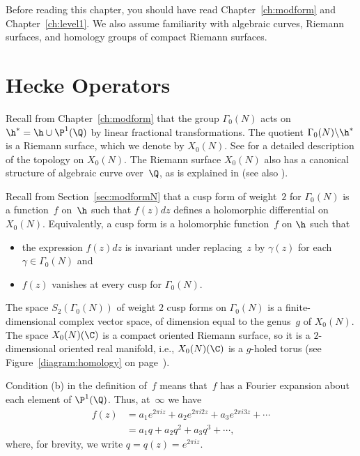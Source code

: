 Before reading this chapter, you should have read
Chapter~\ref{ch:modform} and Chapter~\ref{ch:level1}.
We also assume familiarity with algebraic curves, Riemann surfaces,
and homology groups of compact Riemann surfaces.

\section{Hecke Operators}
\label{sec:modformhecke}

Recall from Chapter~\ref{ch:modform} that the group $\Gamma_0(N)$ acts
on $\h^*=\h\cup \P^1(\Q)$ by linear fractional transformations.
The quotient $\Gamma_0(N)\backslash \h^*$ is a Riemann surface, which
we denote by $X_0(N)$.  See \cite[Ch.~2]{diamond-shurman} for 
a detailed description of the topology on $X_0(N)$.
The Riemann surface $X_0(N)$
also has a canonical structure of algebraic curve over~$\Q$,
as is explained in \cite[Ch.~7]{diamond-shurman}
(see also \cite[\S6.7]{shimura:intro}).

Recall from Section~\ref{sec:modformN} that a cusp form of weight~$2$
for $\Gamma_0(N)$ is a function~$f$ on~$\h$ such that $f(z)dz$ defines
a holomorphic differential on $X_0(N)$.
Equivalently, a cusp form is a holomorphic function~$f$ on $\h$ such
that
\begin{itemize} 
\item[(a)] the expression $f(z)dz$ is invariant
under replacing~$z$ by $\gamma(z)$ for each $\gamma\in \Gamma_0(N)$ and 
\item[(b)] $f(z)$ vanishes at every cusp for $\Gamma_0(N)$.
\end{itemize}
The space $S_2(\Gamma_0(N))$ of weight $2$ cusp forms on $\Gamma_0(N)$ 
is a finite-dimensional complex
vector space, of dimension equal
to the genus~$g$ of $X_0(N)$. 
The space $X_0(N)(\C)$ is a compact oriented Riemann surface,
so it is a $2$-dimensional oriented real manifold, i.e., 
$X_0(N)(\C)$ is a $g$-holed torus (see Figure~\ref{diagram:homology}
on page~\pageref{diagram:homology}).

Condition (b) in the definition of~$f$ means that~$f$ has a Fourier
expansion about each element of $\P^1(\Q)$.  Thus, at~$\infty$ we have
\begin{align*}
f(z) &= a_1 e^{2\pi i z} + a_2 e^{2 \pi i 2z}
       + a_3 e^{2 \pi i 3z} + \cdots\\
     &= a_1 q + a_2 q^2 + a_3 q^3 + \cdots,
\end{align*}
where, for brevity, we write $q=q(z)=e^{2\pi i z}$.


